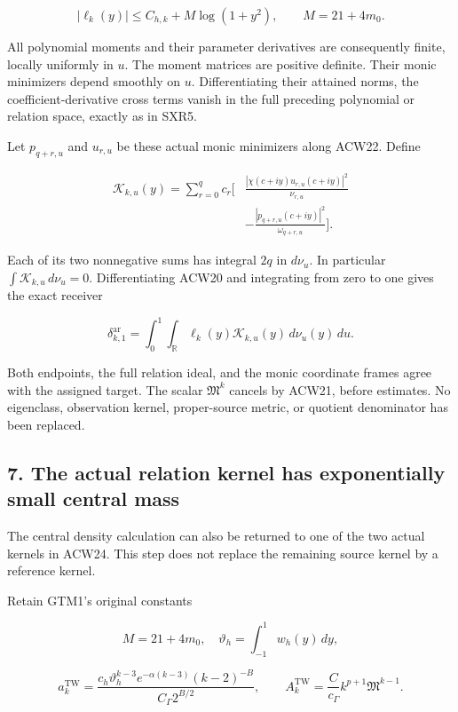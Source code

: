 \[
|\ell_k(y)|\le C_{h,k}+M\log(1+y^2),
\qquad M=21+4m_0.
\]

All polynomial moments and their parameter derivatives are consequently finite, locally uniformly in \(u\). The moment matrices are positive definite. Their monic minimizers depend smoothly on \(u\). Differentiating their attained norms, the coefficient-derivative cross terms vanish in the full preceding polynomial or relation space, exactly as in SXR5.

Let \(p_{q+r,u}\) and \(u_{r,u}\) be these actual monic minimizers along ACW22. Define

\[
\begin{aligned}
\mathcal K_{k,u}(y)=\sum_{r=0}^q c_r\bigg[
&\frac{|\chi(c+iy)u_{r,u}(c+iy)|^2}{\nu_{r,u}}\\
&-\frac{|p_{q+r,u}(c+iy)|^2}{\omega_{q+r,u}}
\bigg].
\end{aligned}
\tag{ACW23}
\]

Each of its two nonnegative sums has integral \(2q\) in \(d\nu_u\). In particular \(\int\mathcal K_{k,u}\,d\nu_u=0\). Differentiating ACW20 and integrating from zero to one gives the exact receiver

\[
\boxed{
\delta_{k,1}^{\mathrm{ar}}
=\int_0^1\int_{\mathbb R}
\ell_k(y)\mathcal K_{k,u}(y)\,d\nu_u(y)\,du.}
\tag{ACW24}
\]

Both endpoints, the full relation ideal, and the monic coordinate frames agree with the assigned target. The scalar \(\mathfrak M^k\) cancels by ACW21, before estimates. No eigenclass, observation kernel, proper-source metric, or quotient denominator has been replaced.

\subsection{7. The actual relation kernel has exponentially small central mass}\label{acw:the-actual-relation-kernel-has-exponentially-small-central-mass}

The central density calculation can also be returned to one of the two actual kernels in ACW24. This step does not replace the remaining source kernel by a reference kernel.

Retain GTM1's original constants

\[
M=21+4m_0,\quad
\vartheta_h=\int_{-1}^1 w_h(y)\,dy,
\]

\[
a_k^{\mathrm{TW}}=
\frac{c_h\vartheta_h^{k-3}e^{-\alpha(k-3)}(k-2)^{-B}}
 {C_\Gamma2^{B/2}},\qquad
A_k^{\mathrm{TW}}=\frac{C}{c_\Gamma}k^{p+1}\mathfrak M^{k-1}.
\]

